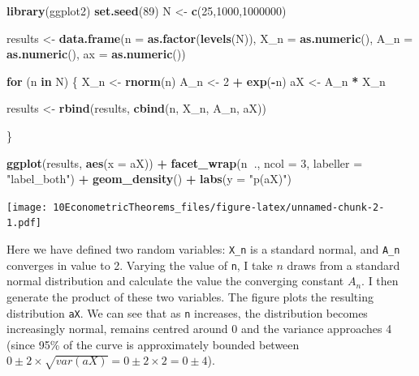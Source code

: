 \documentclass[
]{book}
\newenvironment{Shaded}{\begin{snugshade}}{\end{snugshade}}
\newcommand{\ControlFlowTok}[1]{\textcolor[rgb]{0.13,0.29,0.53}{\textbf{#1}}}
\newcommand{\DataTypeTok}[1]{\textcolor[rgb]{0.13,0.29,0.53}{#1}}
\newcommand{\DecValTok}[1]{\textcolor[rgb]{0.00,0.00,0.81}{#1}}
\newcommand{\KeywordTok}[1]{\textcolor[rgb]{0.13,0.29,0.53}{\textbf{#1}}}
\newcommand{\NormalTok}[1]{#1}
\newcommand{\OperatorTok}[1]{\textcolor[rgb]{0.81,0.36,0.00}{\textbf{#1}}}
\newcommand{\StringTok}[1]{\textcolor[rgb]{0.31,0.60,0.02}{#1}}
\begin{document}
\begin{Shaded}
\begin{Highlighting}[]
\KeywordTok{library}\NormalTok{(ggplot2)}
\KeywordTok{set.seed}\NormalTok{(}\DecValTok{89}\NormalTok{)}
\NormalTok{N <-}\StringTok{ }\KeywordTok{c}\NormalTok{(}\DecValTok{25}\NormalTok{,}\DecValTok{1000}\NormalTok{,}\DecValTok{1000000}\NormalTok{)}

\NormalTok{results <-}\StringTok{ }\KeywordTok{data.frame}\NormalTok{(}\DataTypeTok{n =} \KeywordTok{as.factor}\NormalTok{(}\KeywordTok{levels}\NormalTok{(N)),}
                      \DataTypeTok{X_n =} \KeywordTok{as.numeric}\NormalTok{(),}
                      \DataTypeTok{A_n =} \KeywordTok{as.numeric}\NormalTok{(),}
                      \DataTypeTok{ax =} \KeywordTok{as.numeric}\NormalTok{())}

\ControlFlowTok{for}\NormalTok{ (n }\ControlFlowTok{in}\NormalTok{ N) \{}
\NormalTok{  X_n <-}\StringTok{ }\KeywordTok{rnorm}\NormalTok{(n)}
\NormalTok{  A_n <-}\StringTok{ }\DecValTok{2} \OperatorTok{+}\StringTok{ }\KeywordTok{exp}\NormalTok{(}\OperatorTok{-}\NormalTok{n)}
\NormalTok{  aX <-}\StringTok{ }\NormalTok{A_n }\OperatorTok{*}\StringTok{ }\NormalTok{X_n}
  
\NormalTok{  results <-}\StringTok{ }\KeywordTok{rbind}\NormalTok{(results, }\KeywordTok{cbind}\NormalTok{(n, X_n, A_n, aX))}
  
\NormalTok{\}}

\KeywordTok{ggplot}\NormalTok{(results, }\KeywordTok{aes}\NormalTok{(}\DataTypeTok{x =}\NormalTok{ aX)) }\OperatorTok{+}
\StringTok{  }\KeywordTok{facet_wrap}\NormalTok{(n}\OperatorTok{~}\NormalTok{., }\DataTypeTok{ncol =} \DecValTok{3}\NormalTok{, }\DataTypeTok{labeller =} \StringTok{"label_both"}\NormalTok{) }\OperatorTok{+}
\StringTok{  }\KeywordTok{geom_density}\NormalTok{() }\OperatorTok{+}
\StringTok{  }\KeywordTok{labs}\NormalTok{(}\DataTypeTok{y =} \StringTok{"p(aX)"}\NormalTok{)}
\end{Highlighting}
\end{Shaded}

\texttt{[image: 10EconometricTheorems\_files/figure-latex/unnamed-chunk-2-1.pdf]}

Here we have defined two random variables: \texttt{X\_n} is a standard normal, and \texttt{A\_n} converges in value to 2. Varying the value of \texttt{n}, I take \(n\) draws from a standard normal distribution and calculate the value the converging constant \(A_n\). I then generate the product of these two variables. The figure plots the resulting distribution \texttt{aX}. We can see that as \texttt{n} increases, the distribution becomes increasingly normal, remains centred around 0 and the variance approaches 4 (since 95\% of the curve is approximately bounded between \(0 \pm 2\times\sqrt{var(aX)} = 0 \pm 2\times2 = 0 \pm 4\)).
\end{document}
